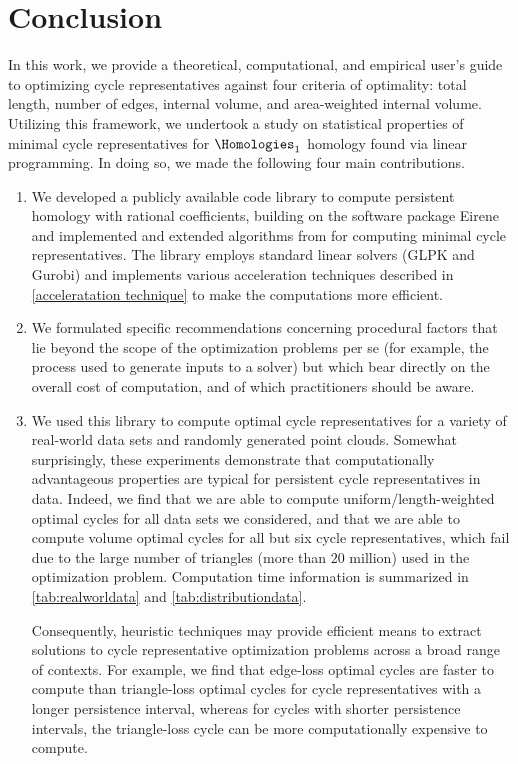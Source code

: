 \section{Conclusion}\label{discussion}

In this work, we provide a theoretical, computational, and empirical user's guide to optimizing cycle representatives against four criteria of optimality: total length, number of edges, internal volume, and area-weighted internal volume. Utilizing this framework, we undertook a study on statistical properties of minimal cycle representatives for $\Homologies_1$ homology found via linear programming. In doing so, we made the following four main contributions.
\begin{enumerate}
    \item We developed a publicly available code library \cite{li_thompson} to compute persistent homology with rational coefficients, building on the software package Eirene \cite{eirene} and implemented and extended algorithms from \cite{Escolar2016, Obayashi2018}  for computing minimal cycle representatives. The library employs standard linear solvers (GLPK and Gurobi) and implements various acceleration techniques described in \se \ref{acceleratation technique} to make the computations more efficient. 
    \item We formulated specific recommendations concerning procedural factors that lie beyond the scope of the optimization problems per se (for example, the process used to generate inputs to a solver) but which bear directly on the overall cost of computation, and of which practitioners should be aware. %
    \item We used this library to compute optimal cycle representatives for a variety of real-world data sets and randomly generated point clouds.  Somewhat surprisingly, these experiments demonstrate that computationally advantageous properties are typical for persistent cycle representatives in data. Indeed, we find that we are able to compute uniform/length-weighted optimal cycles for all data sets we considered, and that we are able to compute volume optimal cycles for all but six cycle representatives, which fail due to the large number of triangles (more than $20$ million) used in the optimization problem. Computation time information is summarized in \tab \ref{tab:realworldata} and \tab \ref{tab:distributiondata}. 
    
    Consequently, heuristic techniques may provide efficient means to extract solutions to cycle representative optimization problems across a broad range of contexts. For example, we find that edge-loss optimal cycles are faster to compute than triangle-loss optimal cycles for cycle representatives with a longer persistence interval, whereas for cycles with shorter persistence intervals, the triangle-loss cycle can be more computationally expensive to compute.
    

\end{enumerate}
